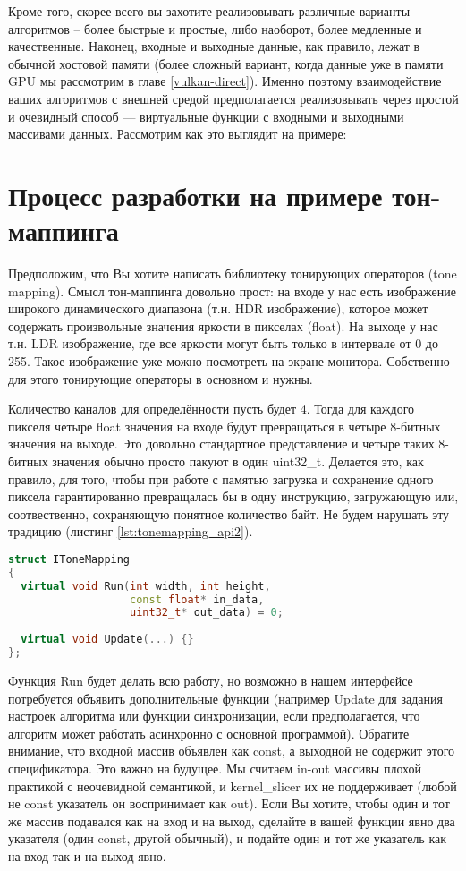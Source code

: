 \documentclass[11pt,fleqn,english,russian]{report} %
\begin{document}
Кроме того, скорее всего вы захотите реализовывать различные варианты алгоритмов -- более быстрые и простые, либо наоборот, более медленные и качественные. Наконец, входные и выходные данные, как правило, лежат в обычной хостовой памяти (более сложный вариант, когда данные уже в памяти GPU мы рассмотрим в главе \ref{vulkan-direct}). Именно поэтому взаимодействие ваших алгоритмов с внешней средой предполагается реализовывать через простой и очевидный способ --- виртуальные функции с входными и выходными массивами данных. Рассмотрим как это выглядит на примере: 

\section{Процесс разработки на примере тон-маппинга}\label{tm_example}

Предположим, что Вы хотите написать библиотеку тонирующих операторов (tone mapping). Смысл тон-маппинга довольно прост: на входе у нас есть изображение широкого динамического диапазона (т.н. HDR изображение), которое может содержать произвольные значения яркости в пикселах (float). На выходе у нас т.н. LDR изображение, где все яркости могут быть только в интервале от 0 до 255. Такое изображение уже можно посмотреть на экране монитора. Собственно для этого тонирующие операторы в основном и нужны.

Количество каналов для определённости пусть будет 4. Тогда для каждого пикселя четыре float значения на входе будут превращаться в четыре 8-битных значения на выходе. Это довольно стандартное представление и четыре таких 8-битных значения обычно просто пакуют в один uint32\_t. Делается это, как правило, для того, чтобы при работе с памятью загрузка и сохранение одного пиксела гарантированно превращалась бы в одну инструкцию, загружающую или, соотвественно, сохраняющую понятное количество байт. Не будем нарушать эту традицию (листинг \ref{lst:tonemapping_api2}).

\begin{lstlisting}[language=C++, caption=интерфейс алгоритмов тон-маппинга]
struct IToneMapping
{
  virtual void Run(int width, int height, 
                   const float* in_data,
                   uint32_t* out_data) = 0;
                   
  virtual void Update(...) {}                 
};
\end{lstlisting}\label{lst:tonemapping_api2}

Функция Run будет делать всю работу, но возможно в нашем интерфейсе потребуется объявить дополнительные функции (например Update для задания настроек алгоритма или функции синхронизации, если предполагается, что алгоритм может работать асинхронно с основной программой). Обратите внимание, что входной массив объявлен как const, а выходной не содержит этого спецификатора. Это важно на будущее. Мы считаем in-out массивы плохой практикой с неочевидной семантикой, и kernel\_slicer их не поддерживает (любой не const указатель он воспринимает как out). Если Вы хотите, чтобы один и тот же массив подавался как на вход и на выход, сделайте в вашей функции явно два указателя (один const, другой обычный), и подайте один и тот же указатель как на вход так и на выход явно.  
\end{document}
